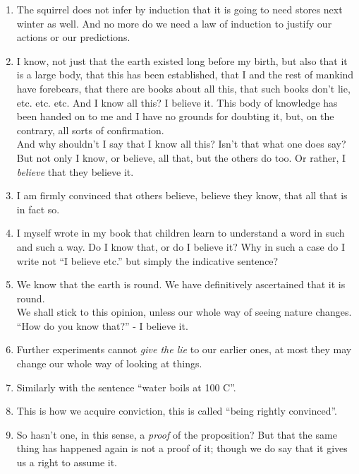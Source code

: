 \documentclass{book}
\begin{document}
\begin{enumerate}
\item
The squirrel does not infer by induction that it is going to need stores next
winter as well. And no more do we need a law of induction to justify our
actions or our predictions.

\item
I know, not just that the earth existed long before my birth, but also that it
is a large body, that this has been established, that I and the rest of mankind
have forebears, that there are books about all this, that such books don't lie,
etc. etc. etc. And I know all this? I believe it. This body of knowledge has
been handed on to me and I have no grounds for doubting it, but, on the
contrary, all sorts of confirmation. \\
And why shouldn't I say that I know all this? Isn't that what one does say?
But not only I know, or believe, all that, but the others do too. Or rather, I
\emph{believe} that they believe it.

\item
I am firmly convinced that others believe, believe they know, that all that is
in fact so.

\item
I myself wrote in my book that children learn to understand a word in such and
such a way. Do I know that, or do I believe it? Why in such a case do I write
not ``I believe etc.'' but simply the indicative sentence?

\item
We know that the earth is round. We have definitively ascertained that it is
round. \\
We shall stick to this opinion, unless our whole way of seeing nature changes.
``How do you know that?'' - I believe it.

\item
Further experiments cannot \emph{give the lie} to our earlier ones, at most
they may change our whole way of looking at things.

\item
Similarly with the sentence ``water boils at 100 C''.

\item
This is how we acquire conviction, this is called ``being rightly convinced''.

\item
So hasn't one, in this sense, a \emph{proof} of the proposition? But that the
same thing has happened again is not a proof of it; though we do say that it
gives us a right to assume it.


\end{enumerate}
\end{document}
